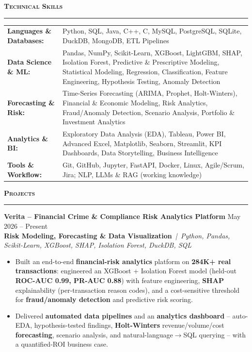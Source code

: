 \documentclass[a4paper,10pt]{article}
\newcommand{\sectionHeader}[2]{%
  \vspace{4pt}%
  \noindent%
  {\normalsize\bfseries\color{HeaderDark}#2\enspace\textsc{#1}}%
  \\[-6pt]%
  {\color{SectionLine}\rule{\textwidth}{1pt}}%
  \vspace{1pt}\par%
}
\newcommand{\projectEntry}[4]{%
  \vspace{1pt}%
  \noindent\textbf{\color{HeaderDark}#1} \hfill {\small\color{SubText}#2}\\[-4pt]%
  {\scriptsize\color{AccentTeal}\textbf{#3}} {\scriptsize\color{TechTag}\textit{\,|\, #4}}%
  \vspace{0pt}\par%
}
\begin{document}
\sectionHeader{Technical Skills}{\faCogs}

\vspace{1pt}
\begin{tabularx}{\textwidth}{@{}l X@{}}
  {\small\textbf{\color{HeaderDark}Languages \& Databases:}} & {\small Python, SQL, Java, C++, C, MySQL, PostgreSQL, SQLite, DuckDB, MongoDB, ETL Pipelines} \\[2pt]
  {\small\textbf{\color{HeaderDark}Data Science \& ML:}} & {\small Pandas, NumPy, Scikit-Learn, XGBoost, LightGBM, SHAP, Isolation Forest, Predictive \& Prescriptive Modeling, Statistical Modeling, Regression, Classification, Feature Engineering, Hypothesis Testing, Anomaly Detection} \\[2pt]
  {\small\textbf{\color{HeaderDark}Forecasting \& Risk:}} & {\small Time-Series Forecasting (ARIMA, Prophet, Holt-Winters), Financial \& Economic Modeling, Risk Analytics, Fraud/Anomaly Detection, Scenario Analysis, Portfolio \& Investment Analytics} \\[2pt]
  {\small\textbf{\color{HeaderDark}Analytics \& BI:}} & {\small Exploratory Data Analysis (EDA), Tableau, Power BI, Advanced Excel, Matplotlib, Seaborn, Streamlit, KPI Dashboards, Data Storytelling, Business Intelligence} \\[2pt]
  {\small\textbf{\color{HeaderDark}Tools \& Workflow:}} & {\small Git, GitHub, Jupyter, FastAPI, Docker, Linux, Agile/Scrum, Jira; NLP, LLMs \& RAG (working knowledge)} \\
\end{tabularx}


\sectionHeader{Projects}{\faProjectDiagram}

\projectEntry{Verita -- Financial Crime \& Compliance Risk Analytics Platform}
  {May 2026 -- Present}
  {Risk Modeling, Forecasting \& Data Visualization}
  {Python, Pandas, Scikit-Learn, XGBoost, SHAP, Isolation Forest, DuckDB, SQL}

\begin{itemize}[leftmargin=14pt, itemsep=0pt, parsep=0pt, topsep=1pt, label={\color{BulletColor}\textbf{--}}]
  \item {\small Built an end-to-end \textbf{financial-risk analytics} platform on \textbf{284K+ real transactions}: engineered an XGBoost + Isolation Forest model (held-out \textbf{ROC-AUC 0.99, PR-AUC 0.88}) with feature engineering, \textbf{SHAP} explainability (per-transaction reason codes), and a cost-sensitive threshold for \textbf{fraud/anomaly detection} and predictive risk scoring.}
  \item {\small Delivered \textbf{automated data pipelines} and an \textbf{analytics dashboard} -- auto-EDA, hypothesis-tested findings, \textbf{Holt-Winters} revenue/volume/cost \textbf{forecasting}, scenario analysis, and natural-language$\rightarrow$SQL querying -- with a quantified-ROI business case.}
\end{itemize}
\end{document}
